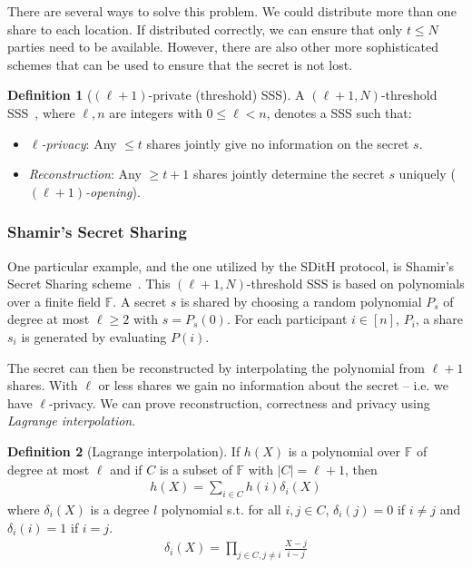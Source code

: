 \documentclass[11pt]{report}
\theoremstyle{definition}
\newtheorem{definition}{Definition}[section]
\theoremstyle{plain}
\begin{document}
There are several ways to solve this problem. We could distribute more than one share to each location. If distributed correctly, we can ensure that only $t \leq N$ parties need to be available. However, there are also other more sophisticated schemes that can be used to ensure that the secret is not lost.

\begin{definition}[$(\ell + 1)$-private (threshold) SSS]\label{def:mpc-ss-threshold}
  A $(\ell + 1, N)$-threshold SSS~\cite{cramer2015secure}, where $\ell, n$ are integers with $0 \leq \ell < n$, denotes a SSS such that:
  \begin{itemize}[parsep=0pt, itemsep=0pt]
    \item \textit{$\ell$-privacy}: Any $\leq t$ shares jointly give no information on the secret $s$.
    \item \textit{Reconstruction}: Any $\geq t + 1$ shares jointly determine the secret $s$ uniquely (\textit{$(\ell + 1)$-opening}).
  \end{itemize}
\end{definition}

\subsubsection{Shamir's Secret Sharing}\label{sub:shamir}

One particular example, and the one utilized by the SDitH protocol, is Shamir's Secret Sharing scheme~\cite{shamir1979share,cramer2015secure}. This $(\ell + 1, N)$-threshold SSS is based on polynomials over a finite field $\mathbb{F}$. A secret $s$ is shared by choosing a random polynomial $P_s$ of degree at most $\ell \geq 2$ with $s = P_s(0)$. For each participant $i \in [n]$, $P_i$, a share $s_i$ is generated by evaluating $P(i)$.

The secret can then be reconstructed by interpolating the polynomial from $\ell + 1$ shares. With $\ell$ or less shares we gain no information about the secret -- i.e. we have $\ell$-privacy. We can prove reconstruction, correctness and privacy using \textit{Lagrange interpolation}.

\begin{definition}[Lagrange interpolation]\label{def:lagrange}
  If $h(X)$ is a polynomial over $\mathbb{F}$ of degree at most $\ell$ and if $C$ is a subset of $\mathbb{F}$ with $|C| = \ell + 1$, then
  \begin{align}\label{eq:lagrange1}
    h(X) = \sum_{i\in C}h(i)\delta_i(X)
  \end{align}
  where $\delta_i(X)$ is a degree $l$ polynomial s.t. for all $i,j \in C$, $\delta_i(j) = 0$ if $i \neq j$ and $\delta_i(i) = 1$ if $i = j$.
  \begin{align}\label{eq:lagrange2}
    \delta_i(X) = \prod_{j \in C,j\neq i} \frac{X-j}{i-j}
  \end{align}
\end{definition}
\end{document}
